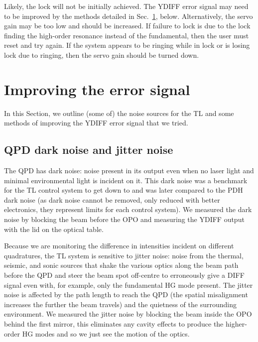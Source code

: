 \documentclass[aps,pra,superscriptaddress,reprint,nofootinbib]{revtex4-1}
\begin{document}
Likely, the lock will not be initially achieved. The YDIFF error signal may need to be improved by the methods detailed in Sec.~\ref{sec:error_signal}, below. Alternatively, the servo gain may be too low and should be increased. If failure to lock is due to the lock finding the high-order resonance instead of the fundamental, then the user must reset and try again. If the system appears to be ringing while in lock or is losing lock due to ringing, then the servo gain should be turned down.


\section{Improving the error signal}
\label{sec:error_signal}

In this Section, we outline (some of) the noise sources for the TL and some methods of improving the YDIFF error signal that we tried.

\subsection{QPD dark noise and jitter noise}

The QPD has dark noise: noise present in its output even when no laser light and minimal environmental light is incident on it. This dark noise was a benchmark for the TL control system to get down to and was later compared to the PDH dark noise (as dark noise cannot be removed, only reduced with better electronics, they represent limits for each control system). We measured the dark noise by blocking the beam before the OPO and measuring the YDIFF output with the lid on the optical table.

Because we are monitoring the difference in intensities incident on different quadratures, the TL system is sensitive to jitter noise: noise from the thermal, seismic, and sonic sources that shake the various optics along the beam path before the QPD and steer the beam spot off-centre to erroneously give a DIFF signal even with, for example, only the fundamental HG mode present. The jitter noise is affected by the path length to reach the QPD (the spatial misalignment increases the further the beam travels) and the quietness of the surrounding environment. We measured the jitter noise by blocking the beam inside the OPO behind the first mirror, this eliminates any cavity effects to produce the higher-order HG modes and so we just see the motion of the optics.
\end{document}
